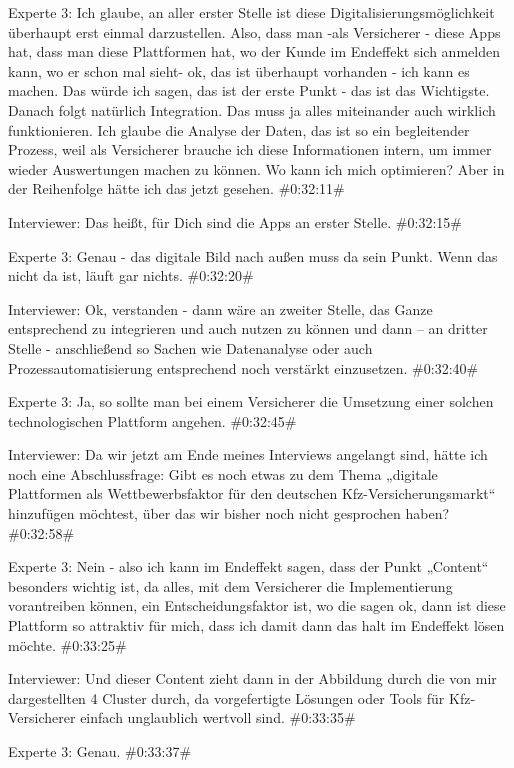 Experte 3:
Ich glaube, an aller erster Stelle ist diese Digitalisierungsmöglichkeit überhaupt erst einmal darzustellen. Also, dass man -als Versicherer - diese Apps hat, dass man diese Plattformen hat, wo der Kunde im Endeffekt sich anmelden kann, wo er schon mal sieht- ok, das ist überhaupt vorhanden - ich kann es machen. Das würde ich sagen, das ist der erste Punkt - das ist das Wichtigste. Danach folgt natürlich Integration. Das muss ja alles miteinander auch wirklich funktionieren. Ich glaube die Analyse der Daten, das ist so ein begleitender Prozess, weil als Versicherer brauche ich diese Informationen intern, um immer wieder Auswertungen machen zu können. Wo kann ich mich optimieren? Aber in der Reihenfolge hätte ich das jetzt gesehen.
\#0:32:11\#

Interviewer:
Das heißt, für Dich sind die Apps an erster Stelle.
\#0:32:15\#

Experte 3:
Genau - das digitale Bild nach außen muss da sein Punkt. Wenn das nicht da ist, läuft gar nichts.
\#0:32:20\#

Interviewer:
Ok, verstanden - dann wäre an zweiter Stelle, das Ganze entsprechend zu integrieren und auch nutzen zu können und dann – an dritter Stelle - anschließend so Sachen wie Datenanalyse oder auch Prozessautomatisierung entsprechend noch verstärkt einzusetzen.
\#0:32:40\#

Experte 3:
Ja, so sollte man bei einem Versicherer die Umsetzung einer solchen technologischen Plattform angehen.
\#0:32:45\#

Interviewer:
Da wir jetzt am Ende meines Interviews angelangt sind, hätte ich noch eine Abschlussfrage: Gibt es noch etwas zu dem Thema „digitale Plattformen als Wettbewerbsfaktor für den deutschen Kfz-Versicherungsmarkt“ hinzufügen möchtest, über das wir bisher noch nicht gesprochen haben?
\#0:32:58\#

Experte 3:
Nein - also ich kann im Endeffekt sagen, dass der Punkt „Content“ besonders wichtig ist, da alles, mit dem Versicherer die Implementierung vorantreiben können, ein Entscheidungsfaktor ist, wo die sagen ok, dann ist diese Plattform so attraktiv für mich, dass ich damit dann das halt im Endeffekt lösen möchte. 
\#0:33:25\#

Interviewer:
Und dieser Content zieht dann in der Abbildung durch die von mir dargestellten 4 Cluster durch, da vorgefertigte Lösungen oder Tools für Kfz-Versicherer einfach unglaublich wertvoll sind.
\#0:33:35\#

Experte 3:
Genau.
\#0:33:37\#

